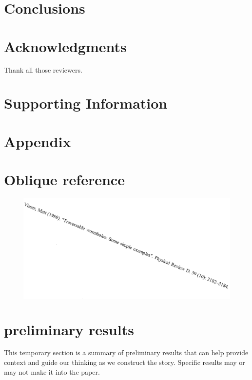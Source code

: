 \documentclass{article}
\begin{document}
\section{Conclusions}

\section{Acknowledgments}
Thank all those reviewers.

\section{Supporting Information}

\section{Appendix}



\section{Oblique reference}

\begin{figure}[H]
	\includegraphics[scale=0.5]{../figures/oblique_reference.png}
\end{figure}

\section{preliminary results}
This temporary section is a summary of preliminary results that can help provide context and guide our thinking as we construct the story.  Specific results may or may not make it into the paper.
\end{document}
